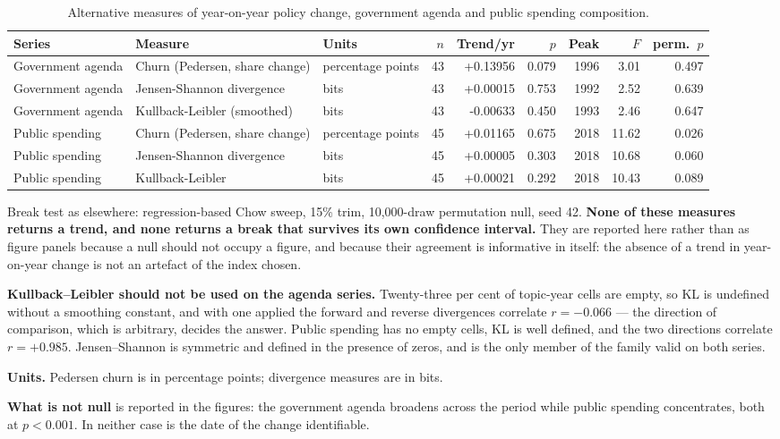 \begin{table}[htbp]\centering
\caption{Alternative measures of year-on-year policy change, government agenda and public spending composition.}
\begin{threeparttable}
\begin{tabular}{p{2.6cm} p{3.4cm} p{2.0cm} r r r r r r}
\toprule
Series & Measure & Units & $n$ & Trend/yr & $p$ & Peak & $F$ & perm.\ $p$ \\
\midrule
Government agenda & Churn (Pedersen, share change) & percentage points & 43 & +0.13956 & 0.079 & 1996 & 3.01 & 0.497 \\
Government agenda & Jensen-Shannon divergence & bits & 43 & +0.00015 & 0.753 & 1992 & 2.52 & 0.639 \\
Government agenda & Kullback-Leibler (smoothed) & bits & 43 & -0.00633 & 0.450 & 1993 & 2.46 & 0.647 \\
Public spending & Churn (Pedersen, share change) & percentage points & 45 & +0.01165 & 0.675 & 2018 & 11.62 & 0.026 \\
Public spending & Jensen-Shannon divergence & bits & 45 & +0.00005 & 0.303 & 2018 & 10.68 & 0.060 \\
Public spending & Kullback-Leibler & bits & 45 & +0.00021 & 0.292 & 2018 & 10.43 & 0.089 \\
\bottomrule
\end{tabular}
\begin{tablenotes}\footnotesize
\item Break test as elsewhere: regression-based Chow sweep, 15\% trim, 10,000-draw permutation
null, seed 42. \textbf{None of these measures returns a trend, and none returns a break that
survives its own confidence interval.} They are reported here rather than as figure panels because
a null should not occupy a figure, and because their agreement is informative in itself: the
absence of a trend in year-on-year change is not an artefact of the index chosen.
\item \textbf{Kullback--Leibler should not be used on the agenda series.} Twenty-three per cent of
topic-year cells are empty, so KL is undefined without a smoothing constant, and with one applied
the forward and reverse divergences correlate $r=-0.066$ --- the direction of comparison, which is
arbitrary, decides the answer. Public spending has no empty cells, KL is well defined, and the two
directions correlate $r=+0.985$. Jensen--Shannon is symmetric and defined in the presence of zeros,
and is the only member of the family valid on both series.
\item \textbf{Units.} Pedersen churn is in percentage points; divergence measures are in bits.
\item \textbf{What is not null} is reported in the figures: the government agenda broadens across
the period while public spending concentrates, both at $p<0.001$. In neither case is the date of
the change identifiable.
\end{tablenotes}
\end{threeparttable}
\end{table}
